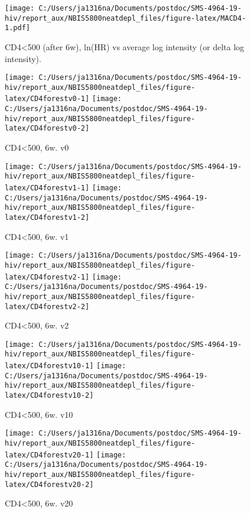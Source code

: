 \documentclass[
]{article}
\begin{document}
\begin{figure}
\centering
\texttt{[image: C:/Users/ja1316na/Documents/postdoc/SMS-4964-19-hiv/report\_aux/NBIS5800neatdepl\_files/figure-latex/MACD4-1.pdf]}
\caption{\label{fig:MACD4}CD4\textless500 (after 6w), ln(HR) vs average log intensity (or delta log intensity).}
\end{figure}

\begin{figure}
\texttt{[image: C:/Users/ja1316na/Documents/postdoc/SMS-4964-19-hiv/report\_aux/NBIS5800neatdepl\_files/figure-latex/CD4forestv0-1]} \texttt{[image: C:/Users/ja1316na/Documents/postdoc/SMS-4964-19-hiv/report\_aux/NBIS5800neatdepl\_files/figure-latex/CD4forestv0-2]} \caption{CD4<500, 6w. v0}\label{fig:CD4forestv0}
\end{figure}

\begin{figure}
\texttt{[image: C:/Users/ja1316na/Documents/postdoc/SMS-4964-19-hiv/report\_aux/NBIS5800neatdepl\_files/figure-latex/CD4forestv1-1]} \texttt{[image: C:/Users/ja1316na/Documents/postdoc/SMS-4964-19-hiv/report\_aux/NBIS5800neatdepl\_files/figure-latex/CD4forestv1-2]} \caption{CD4<500, 6w. v1}\label{fig:CD4forestv1}
\end{figure}

\begin{figure}
\texttt{[image: C:/Users/ja1316na/Documents/postdoc/SMS-4964-19-hiv/report\_aux/NBIS5800neatdepl\_files/figure-latex/CD4forestv2-1]} \texttt{[image: C:/Users/ja1316na/Documents/postdoc/SMS-4964-19-hiv/report\_aux/NBIS5800neatdepl\_files/figure-latex/CD4forestv2-2]} \caption{CD4<500, 6w. v2}\label{fig:CD4forestv2}
\end{figure}

\begin{figure}
\texttt{[image: C:/Users/ja1316na/Documents/postdoc/SMS-4964-19-hiv/report\_aux/NBIS5800neatdepl\_files/figure-latex/CD4forestv10-1]} \texttt{[image: C:/Users/ja1316na/Documents/postdoc/SMS-4964-19-hiv/report\_aux/NBIS5800neatdepl\_files/figure-latex/CD4forestv10-2]} \caption{CD4<500, 6w. v10}\label{fig:CD4forestv10}
\end{figure}

\begin{figure}
\texttt{[image: C:/Users/ja1316na/Documents/postdoc/SMS-4964-19-hiv/report\_aux/NBIS5800neatdepl\_files/figure-latex/CD4forestv20-1]} \texttt{[image: C:/Users/ja1316na/Documents/postdoc/SMS-4964-19-hiv/report\_aux/NBIS5800neatdepl\_files/figure-latex/CD4forestv20-2]} \caption{CD4<500, 6w. v20}\label{fig:CD4forestv20}
\end{figure}
\end{document}
